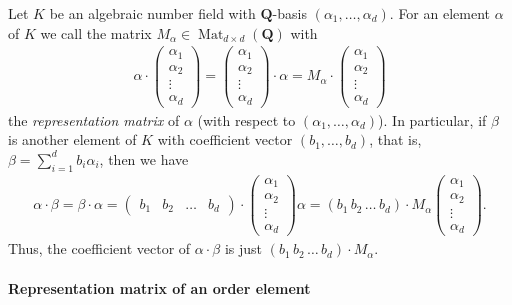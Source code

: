 \documentclass[a4paper,10pt]{article}
\newcommand{\Q}{\mathbf{Q}}
\newcommand{\Mat}{\operatorname{Mat}}
\begin{document}
Let $K$ be an algebraic number field with $\Q$-basis $(\alpha_1,\dotsc,\alpha_d)$.
For an element $\alpha$ of $K$ we call the matrix $M_\alpha \in \Mat_{d \times d} (\Q)$ with
\begin{align*} \alpha \cdot \begin{pmatrix} \alpha_1 \\ \alpha_2 \\ \vdots \\ \alpha_d \end{pmatrix} = \begin{pmatrix} \alpha_1 \\ \alpha_2 \\ \vdots \\ \alpha_d \end{pmatrix} \cdot \alpha = M_\alpha \cdot \begin{pmatrix} \alpha_1 \\ \alpha_2 \\ \vdots \\ \alpha_d \end{pmatrix}
\end{align*}
the \textit{representation matrix} of $\alpha$ (with respect to $(\alpha_1,\dotsc,\alpha_d)$).
In particular, if $\beta$ is another element of $K$ with coefficient vector $(b_1,\dotsc,b_d)$, that is, $\beta = \sum_{i=1}^d b_i \alpha_i$, then we have
\begin{align*} \alpha \cdot \beta = \beta \cdot \alpha = \begin{pmatrix} b_1 & b_2 & \dotsc & b_d \end{pmatrix} \cdot \begin{pmatrix} \alpha_1 \\ \alpha_2 \\ \vdots \\ \alpha_d \end{pmatrix} \alpha = (b_1 \, b_2 \, \dotsc \, b_d ) \cdot M_\alpha \begin{pmatrix} \alpha_1 \\ \alpha_2 \\ \vdots \\ \alpha_d \end{pmatrix}. \end{align*}
Thus, the coefficient vector of $\alpha \cdot \beta$ is just $(b_1\, b_2 \, \dotsc \, b_d ) \cdot M_\alpha$.

\paragraph{Representation matrix of an order element}
\end{document}
